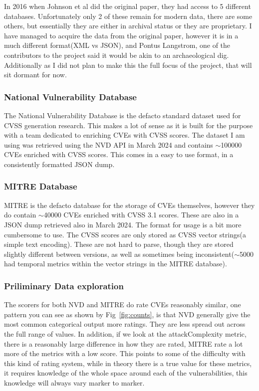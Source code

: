 \documentclass[12pt]{article}
\begin{document}
In 2016 when Johnson et al\cite{bayes} did the original paper, they had access to 5 different
databases. Unfortunately only 2 of these remain for modern data, there are some others, but
essentially they are either in archival status or they are proprietary. I have managed to acquire
the data from the original paper, however it is in a much different format(XML vs JSON), and Pontus
Langstrom, one of the contributors to the project said it would be akin to an archaeological dig.
Additionally as I did not plan to make this the full focus of the project, that will sit dormant for
now.

\subsubsection*{National Vulnerability Database}

The National Vulnerability Database is the defacto standard dataset used for CVSS generation
research.\cite{costa}\cite{nvd_example1}\cite{nvd_example2} This makes a lot of sense as it is built
for the purpose with a team dedicated to enriching CVEs with CVSS scores. The dataset I am using was
retrieved using the NVD API in March 2024 and contains $\sim$100000 CVEs enriched with CVSS scores. This
comes in a easy to use format, in a consistently formatted JSON dump.

\subsubsection*{MITRE Database}

MITRE is the defacto database for the storage of CVEs themselves, however they do contain $\sim$40000
CVEs enriched with CVSS 3.1 scores. These are also in a JSON dump retrieved also in March 2024. The
format for usage is a bit more cumbersome to use. The CVSS scores are only stored as CVSS vector
strings(a simple text encoding\cite{vector_string}). These are not hard to parse, though they are stored slightly
different between versions, as well as sometimes being inconsistent($\sim$5000 had temporal metrics within
the vector strings in the MITRE database).

\subsubsection{Priliminary Data exploration}

The scorers for both NVD and MITRE do rate CVEs reasonably similar, one pattern you can see as shown
by Fig~\ref{fig:counts}, is that NVD generally give the most common categorical output more ratings.
They are less spread out across the full range of values. In addition, if we look at the
attackComplexity metric, there is a reasonably large difference in how they are rated, MITRE rate a
lot more of the metrics with a low score. This points to some of the difficulty with this kind of
rating system, while in theory there is a true value for these metrics, it requires knowledge of the
whole space around each of the vulnerabilities, this knowledge will always vary marker to marker.
\end{document}
